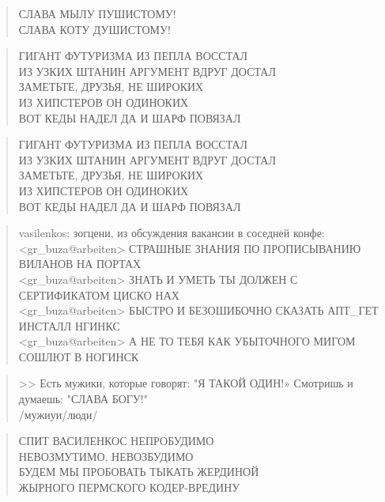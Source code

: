 \poemtitle{***}
\begin{verse}
СЛАВА МЫЛУ ПУШИСТОМУ!\\
СЛАВА КОТУ ДУШИСТОМУ!
\end{verse}

\poemtitle{***}
\begin{verse}
ГИГАНТ ФУТУРИЗМА ИЗ ПЕПЛА ВОССТАЛ\\
ИЗ УЗКИХ ШТАНИН АРГУМЕНТ ВДРУГ ДОСТАЛ\\
ЗАМЕТЬТЕ, ДРУЗЬЯ, НЕ ШИРОКИХ\\
ИЗ ХИПСТЕРОВ ОН ОДИНОКИХ\\
ВОТ КЕДЫ НАДЕЛ ДА И ШАРФ ПОВЯЗАЛ
\end{verse}

\poemtitle{***}
\begin{verse}
ГИГАНТ ФУТУРИЗМА ИЗ ПЕПЛА ВОССТАЛ\\
ИЗ УЗКИХ ШТАНИН АРГУМЕНТ ВДРУГ ДОСТАЛ\\
ЗАМЕТЬТЕ, ДРУЗЬЯ, НЕ ШИРОКИХ\\
ИЗ ХИПСТЕРОВ ОН ОДИНОКИХ\\
ВОТ КЕДЫ НАДЕЛ ДА И ШАРФ ПОВЯЗАЛ
\end{verse}

\poemtitle{***}
\begin{verse}
vasilenkos: зогцени, из обсуждения вакансии в соседней конфе:\\
[23:32:10]<gr\_buza@arbeiten> СТРАШНЫЕ ЗНАНИЯ ПО ПРОПИСЫВАНИЮ ВИЛАНОВ НА ПОРТАХ\\
[23:32:22]<gr\_buza@arbeiten> ЗНАТЬ И УМЕТЬ ТЫ ДОЛЖЕН С СЕРТИФИКАТОМ ЦИСКО НАХ\\
[23:32:46]<gr\_buza@arbeiten> БЫСТРО И БЕЗОШИБОЧНО СКАЗАТЬ АПТ\_ГЕТ ИНСТАЛЛ НГИНКС\\
[23:33:10]<gr\_buza@arbeiten> А НЕ ТО ТЕБЯ КАК УБЫТОЧНОГО МИГОМ СОШЛЮТ В НОГИНСК
\end{verse}

\poemtitle{***}
\begin{verse}
>> Есть мужики, которые говорят: "Я ТАКОЙ ОДИН!» Смотришь и думаешь: "СЛАВА БОГУ!"\\
/мужиуи/люди/
\end{verse}

\poemtitle{***}
\begin{verse}
СПИТ ВАСИЛЕНКОС НЕПРОБУДИМО\\
НЕВОЗМУТИМО, НЕВОЗБУДИМО\\
БУДЕМ МЫ ПРОБОВАТЬ ТЫКАТЬ ЖЕРДИНОЙ\\
ЖЫРНОГО ПЕРМСКОГО КОДЕР-ВРЕДИНУ
\end{verse}

